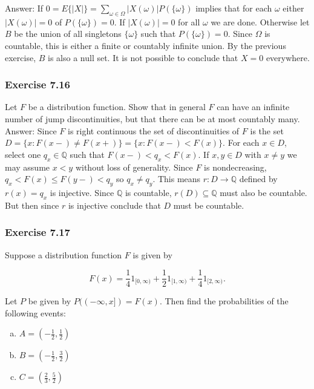 \documentclass{article}
\begin{document}
{Answer: If $0 = E\{|X|\} = \sum_{\omega \in \Omega} |X(\omega)|P(\{\omega\})$ implies that for each $\omega$ either $|X(\omega)| = 0$ of $P(\{\omega\}) = 0$. If $|X(\omega)| = 0$ for all $\omega$ we are done. Otherwise let $B$ be the union of all singletons $\{\omega\}$ such that $P(\{\omega\}) = 0$. Since $\Omega$ is countable, this is either a finite or countably infinite union. By the previous exercise, $B$ is also a null set. It is not possible to conclude that $X = 0$ everywhere. 

\subsubsection*{Exercise 7.16}

Let $F$ be a distribution function. Show that in general $F$ can have an infinite number of jump discontinuities, but that there can be at most countably many. \\

Answer: Since $F$ is right continuous the set of discontinuities of $F$ is the set $D = \{x : F(x-) \neq F(x+)\} = \{x: F(x-) < F(x)\}$. For each $x \in D$, select one $q_x \in \mathbb{Q}$ such that $F(x-) < q_x < F(x)$. If $x,y \in D$ with $x \neq y$ we may assume $x < y$ without loss of generality. Since $F$ is nondecreasing, $q_x < F(x) \leq F(y-) < q_y$ so $q_x \neq q_y$. This means $r: D \rightarrow \mathbb{Q}$ defined by $r(x) = q_x$ is injective. Since $\mathbb{Q}$ is countable, $r(D) \subseteq \mathbb{Q}$ must also be countable. But then since $r$ is injective conclude that $D$ must be countable. 

\subsubsection*{Exercise 7.17}

Suppose a distribution function $F$ is given by

$$
F(x) = \frac{1}{4} 1_{[0,\infty)} + \frac{1}{2}1_{[1,\infty)} + \frac{1}{4}1_{[2,\infty)}.
$$

Let $P$ be given by $P((-\infty, x]) = F(x)$. Then find the probabilities of the following events:

\begin{enumerate}[a)]
\item $A = \left(-\frac{1}{2}, \frac{1}{2}\right)$

\item $B = \left(-\frac{1}{2}, \frac{3}{2}\right)$

\item $C = \left(\frac{2}{3}, \frac{5}{2}\right)$


\end{enumerate}}
\end{document}
